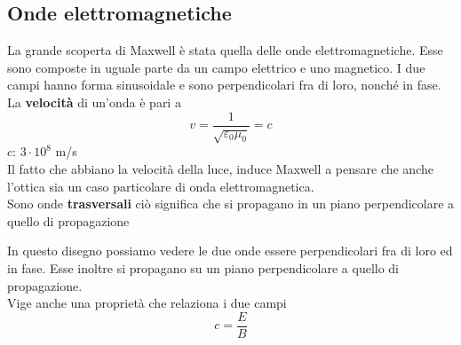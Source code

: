 \subsection{Onde elettromagnetiche}
La grande scoperta di Maxwell è stata quella delle onde elettromagnetiche. Esse sono composte in 
uguale parte da un campo elettrico e uno magnetico. I due campi hanno forma sinusoidale e sono
perpendicolari fra di loro, nonché in fase.\\
La \textbf{velocità} di un'onda è pari a
\begin{equation*}
  v = \frac{1}{\sqrt{\varepsilon_0\mu_0} }=c
\end{equation*}
\hyperref[tab:c]{$c$}: $3\cdot10^8$ m/s\\
Il fatto che abbiano la velocità della luce, induce Maxwell a pensare che anche l'ottica sia un caso
particolare di onda elettromagnetica.\\
Sono onde \textbf{trasversali} ciò significa che si propagano in un piano perpendicolare a quello di
propagazione
\begin{center}
\end{center}
In questo disegno possiamo vedere le due onde essere perpendicolari fra di loro ed in fase. Esse
inoltre si propagano su un piano perpendicolare a quello di propagazione.\\
Vige anche una proprietà che relaziona i due campi
\begin{equation*}
  c = \frac{E}{B}
\end{equation*}


